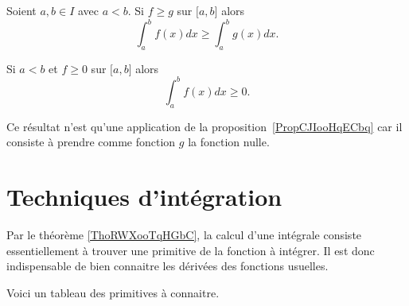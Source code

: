 \begin{proposition}   \label{PropCJIooHqECbq}
    Soient \( a,b\in I\) avec \( a<b\). Si \( f\geq g\) sur \( \mathopen[ a , b \mathclose]\) alors
    \begin{equation}
        \int_a^bf(x)dx\geq \int_a^bg(x)dx.
    \end{equation}
\end{proposition}

\begin{corollary}[Positivité] \label{PropHVWooBDRhCX}
    Si \( a<b\) et \( f\geq 0\) sur \( \mathopen[ a , b \mathclose]\) alors
    \begin{equation}
        \int_a^bf(x)dx\geq 0.
    \end{equation}
\end{corollary}

Ce résultat n'est qu'une application de la proposition~\ref{PropCJIooHqECbq} car il consiste à prendre comme fonction $g$ la fonction nulle.

\section{Techniques d'intégration}

Par le théorème \ref{ThoRWXooTqHGbC}, la calcul d'une intégrale consiste essentiellement à trouver une primitive de la fonction à intégrer.  Il est donc indispensable de bien connaitre les dérivées des fonctions usuelles.

Voici un tableau des primitives à connaitre.

